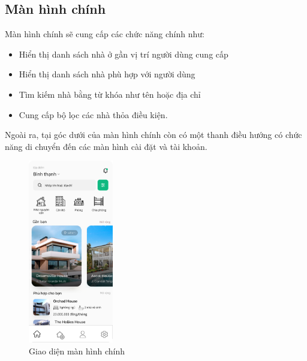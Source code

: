 \subsection{Màn hình chính}
Màn hình chính sẽ cung cấp các chức năng chính như:
\begin{itemize}
    \item Hiển thị danh sách nhà ở gần vị trí người dùng cung cấp
    \item Hiển thị danh sách nhà phù hợp với người dùng
    \item Tìm kiếm nhà bằng từ khóa như tên hoặc địa chỉ
    \item Cung cấp bộ lọc các nhà thỏa điều kiện.
\end{itemize}
Ngoài ra, tại góc dưới của màn hình chính còn có một thanh điều hướng có chức năng di chuyển đến các màn hình cài đặt và tài khoản.
\begin{figure}[H]
    \centering
    \includegraphics[width=0.33\textwidth]{Images/UI figma/Full home screen.png}
    \caption{Giao diện màn hình chính}
\end{figure}
\newpage
